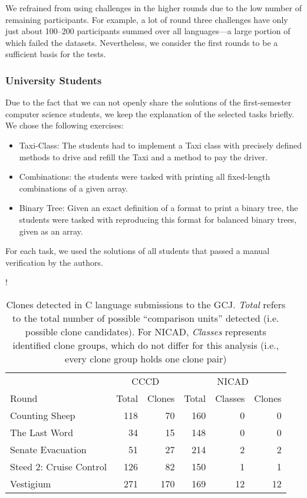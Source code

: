\documentclass[10pt,journal,compsoc]{IEEEtran}
\def\todo#1{\textcolor{brown!80!yellow!70!black!90!red}{[\textsc{todo}: \textsf{#1}]}}
\begin{document}
We refrained from using challenges in the higher rounds due to the low number of remaining participants. For example, a lot of round three challenges have only just about 100--200 participants summed over all languages---a large portion of which failed the datasets.
Nevertheless, we consider the first rounds to be a sufficient basis for the tests.


\subsubsection{University Students}
Due to the fact that we can not openly share the solutions of the first-semester computer science students, we keep the explanation of the selected tasks briefly.
We chose the following exercises:
\begin{itemize}
  \item Taxi-Class: The students had to implement a Taxi class with precisely defined methods to drive and refill the Taxi and a method to pay the driver.
  \item Combinations: the students were tasked with printing all fixed-length combinations of a given array.
  \item Binary Tree: Given an exact definition of a format to print a binary tree, the students were tasked with reproducing this format for balanced binary trees, given as an array.
\end{itemize}
For each task, we used the solutions of all students that passed a manual verification by the authors.

\begin{table}
  \centering\resizebox\linewidth!{\begin{tabular}{l rr rrr}
    \toprule
    & \multicolumn{2}{c}{CCCD} & \multicolumn{3}{c}{NICAD} \\
    \cmidrule(r){2-3} \cmidrule{4-6}
    Round & Total & Clones & Total & Classes & Clones \\
    \midrule
    Counting Sheep & 118 & 70 & 160 & 0 & 0 \\ %
    The Last Word & 34 & 15 & 148 & 0 & 0 \\
    Senate Evacuation & 51 & 27 & 214 & 2 & 2 \\
    Steed 2: Cruise Control & 126 & 82 &  150 & 1 & 1 \\
    Vestigium & 271 & 170 & 169 & 12 & 12 \\
    \bottomrule
  \end{tabular}}\medskip
  \caption{Clones detected in C language submissions to the GCJ. \textit{Total} refers to the total number of possible \enquote{comparison units} detected (i.e. possible clone candidates). For NICAD, \textit{Classes} represents identified clone groups, which do not differ for this analysis (i.e., every clone group holds one clone pair)}
  \label{tbl:clones-c}
\end{table}
\end{document}
